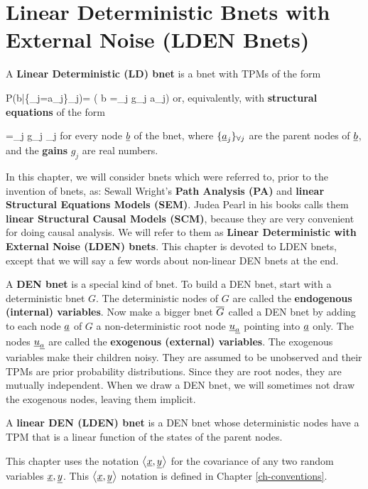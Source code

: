 \chapter{Linear Deterministic Bnets 
with External 
Noise (LDEN Bnets)}\label{ch-LDEN}

A {\bf Linear Deterministic (LD) bnet} is a bnet with TPMs
of the form

\beq
\color{blue}
P(b|\{\rva_j=a_j\}_{\forall j})=
\indi\left(
b =\sum_{j}
g_j a_j\right)
\eeq
or, equivalently, with 
{\bf structural  equations}
of the form

\beq\color{blue}
\rvb =\sum_{j} g_j \rva_j
\quad\quad\quad
{\color{black}
}
\eeq
for every node $\rvb$
of the bnet,
where $\{\rva_j\}_{\forall j}$
are the parent nodes of $\rvb$,
and the {\bf gains} $g_j$
are real numbers.

In this chapter, we will consider 
bnets which were referred to,
prior to the invention of bnets, as:
Sewall Wright's {\bf Path Analysis (PA)}
 and
{\bf linear Structural Equations Models (SEM)}.
Judea Pearl in his
books calls them
{\bf linear Structural Causal Models (SCM)},
because they are very 
convenient for doing causal analysis.
We will refer  to
them as {\bf Linear  Deterministic with 
External Noise
 (LDEN) bnets}.
This chapter
is devoted to LDEN bnets,
except that we will
say a few words
about non-linear DEN
bnets at the end.


A {\bf DEN bnet}
is a special kind of bnet.
To 
build a DEN bnet,
start with a 
deterministic bnet $G$.
The deterministic
nodes of $G$ are called
the {\bf endogenous (internal) variables}.
Now make a bigger bnet $\overline{G}$
called a DEN bnet
by 
adding to each node $\rva$ of $G$ a
non-deterministic  
root node $\rvu_\rva$
pointing into $\rva$ only.
The nodes $\rvu_\rva$ are called
the {\bf exogenous (external) variables}.
The exogenous
variables make their children noisy.
They are assumed 
to be unobserved
and their TPMs are prior
probability distributions.
Since they are 
root nodes, they are 
mutually independent.
When we
draw
a DEN bnet,
we will sometimes
not draw the exogenous nodes,
leaving them implicit.

A {\bf linear DEN (LDEN) bnet} is 
a DEN bnet
whose deterministic nodes
have a TPM that is a linear 
function of the states
of the parent nodes.

This chapter 
uses the notation
$\av{\rvx, \rvy}$
for the
covariance
of any two random variables $\rvx, \rvy$.
This $\av{\rvx, \rvy}$ notation
is defined in Chapter \ref{ch-conventions}.


